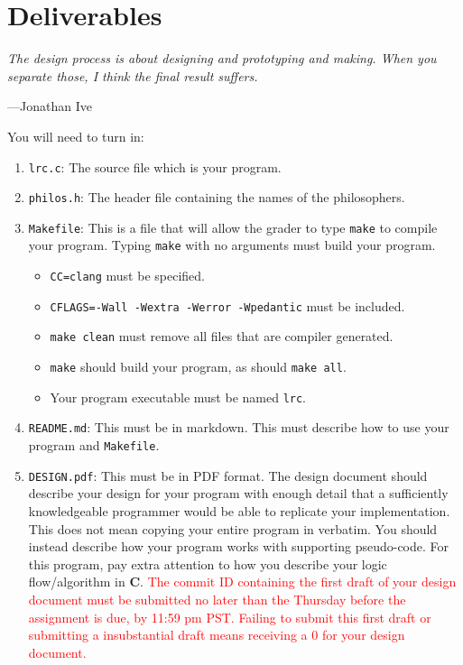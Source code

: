 \documentclass{article}
\begin{document}

\section{Deliverables}
\epigraph{\emph{The design process is about designing and prototyping and
making. When you separate those, I think the final result
suffers.}}{---Jonathan Ive}\noindent

You will need to turn in:

\begin{enumerate}
\item \texttt{lrc.c}: The source file which is your program.
\item \texttt{philos.h}: The header file containing the names of the
  philosophers.
\item \texttt{Makefile}: This is a file that will allow the grader to type
    \texttt{make} to compile your program. Typing \texttt{make} with no
    arguments must build your program.
\begin{itemize}
\item \texttt{CC=clang} must be specified.
\item \texttt{CFLAGS=-Wall -Wextra -Werror -Wpedantic} must be included.
\item \texttt{make clean} must remove all files that are compiler generated.
\item \texttt{make} should build your program, as should \texttt{make all}.
\item Your program executable must be named \texttt{lrc}.
\end{itemize}

\item \texttt{README.md}: This must be in markdown.
This must describe how to use your program and \texttt{Makefile}.

\item \texttt{DESIGN.pdf}: This must be in PDF format. The design document
should describe your design for your program with enough detail
that a sufficiently knowledgeable programmer would be able to
replicate your implementation. This does not mean copying your
entire program in verbatim. You should instead describe how your
program works with supporting pseudo-code. For this program, pay
extra attention to how you describe your logic flow/algorithm in
\textbf{C}. \textcolor{red}{The commit ID containing the first draft of
  your design document must be submitted no later than the Thursday
  before the assignment is due, by 11:59 pm PST. Failing to submit this
  first draft or submitting a insubstantial draft means receiving a 0
for your design document.}

\end{enumerate}
\end{document}

